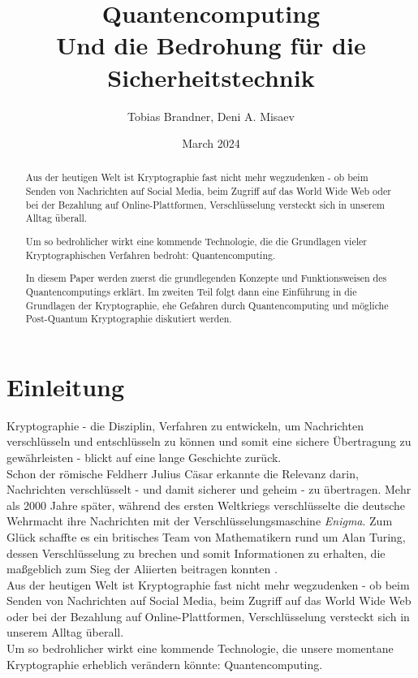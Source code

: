 \documentclass[12pt]{IEEEtran}
\title{\Huge Quantencomputing \\
\LARGE Und die Bedrohung für die Sicherheitstechnik}
\author{Tobias Brandner, Deni A. Misaev}
\date{March 2024}
\begin{document}
\maketitle

\begin{abstract}
\centering
Aus der heutigen Welt ist Kryptographie fast nicht mehr wegzudenken - ob beim Senden von Nachrichten auf Social Media, beim Zugriff auf das World Wide Web oder bei der Bezahlung auf Online-Plattformen, Verschlüsselung versteckt sich in unserem Alltag überall.

Um so bedrohlicher wirkt eine kommende Technologie, die die Grundlagen vieler Kryptographischen Verfahren bedroht: Quantencomputing.

In diesem Paper werden zuerst die grundlegenden Konzepte und Funktionsweisen des Quantencomputings erklärt. Im zweiten Teil folgt dann eine Einführung in die Grundlagen der Kryptographie, ehe Gefahren durch Quantencomputing und mögliche Post-Quantum Kryptographie diskutiert werden.
\end{abstract}

\newpage
\tableofcontents
\newpage
\section{Einleitung}

Kryptographie - die Disziplin, Verfahren zu entwickeln, um Nachrichten verschlüsseln und entschlüsseln zu können und somit eine sichere Übertragung zu gewährleisten - blickt auf eine lange Geschichte zurück. \\

Schon der römische Feldherr Julius Cäsar erkannte die Relevanz darin, Nachrichten verschlüsselt - und damit sicherer und geheim - zu übertragen. \cite{Uhl2022Krypto} Mehr als 2000 Jahre später, während des ersten Weltkriegs verschlüsselte die deutsche Wehrmacht ihre Nachrichten mit der Verschlüsselungsmaschine \textit{Enigma}. Zum Glück schaffte es ein britisches Team von Mathematikern rund um Alan Turing, dessen Verschlüsselung zu brechen und somit Informationen zu erhalten, die maßgeblich zum Sieg der Aliierten beitragen konnten . \cite{Enigma} \\

Aus der heutigen Welt ist Kryptographie fast nicht mehr wegzudenken - ob beim Senden von Nachrichten auf Social Media, beim Zugriff auf das World Wide Web oder bei der Bezahlung auf Online-Plattformen, Verschlüsselung versteckt sich in unserem Alltag überall.\\
Um so bedrohlicher wirkt eine kommende Technologie, die unsere momentane Kryptographie erheblich verändern könnte: Quantencomputing.\\
\end{document}
